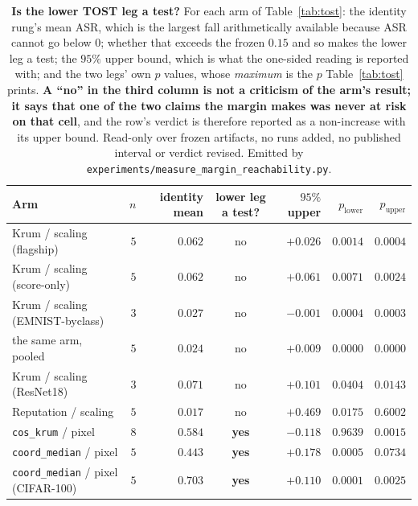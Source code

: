 \documentclass{article}
\begin{document}
\begin{table}[t]
\centering\small\setlength{\tabcolsep}{4pt}
\caption{\textbf{Is the lower TOST leg a test?} For each arm of Table~\ref{tab:tost}: the identity
rung's mean ASR, which is the largest fall arithmetically available because ASR cannot go below $0$;
whether that exceeds the frozen $0.15$ and so makes the lower leg a test; the $95\%$ upper bound, which
is what the one-sided reading is reported with; and the two legs' own $p$ values, whose \emph{maximum} is
the $p$ Table~\ref{tab:tost} prints. \textbf{A ``no'' in the third column is not a criticism of the
arm's result; it says that one of the two claims the margin makes was never at risk on that cell}, and
the row's verdict is therefore reported as a non-increase with its upper bound. Read-only over frozen
artifacts, no runs added, no published interval or verdict revised. Emitted by
\texttt{experiments/\allowbreak measure\_\allowbreak margin\_\allowbreak reachability.py}.}
\label{tab:reach}
\begin{tabular}{@{}lrrcrrr@{}}
\toprule
Arm & $n$ & identity mean & lower leg a test? & $95\%$ upper & $p_{\mathrm{lower}}$ & $p_{\mathrm{upper}}$ \\
\midrule
Krum / scaling (flagship) & $5$ & $0.062$ & no & $+0.026$ & $0.0014$ & $0.0004$ \\
Krum / scaling (score-only) & $5$ & $0.062$ & no & $+0.061$ & $0.0071$ & $0.0024$ \\
Krum / scaling (EMNIST-byclass) & $3$ & $0.027$ & no & $-0.001$ & $0.0004$ & $0.0003$ \\
\quad the same arm, pooled & $5$ & $0.024$ & no & $+0.009$ & $0.0000$ & $0.0000$ \\
Krum / scaling (ResNet18) & $3$ & $0.071$ & no & $+0.101$ & $0.0404$ & $0.0143$ \\
Reputation / scaling & $5$ & $0.017$ & no & $+0.469$ & $0.0175$ & $0.6002$ \\
\texttt{cos\_krum} / pixel & $8$ & $0.584$ & \textbf{yes} & $-0.118$ & $0.9639$ & $0.0015$ \\
\texttt{coord\_median} / pixel & $5$ & $0.443$ & \textbf{yes} & $+0.178$ & $0.0005$ & $0.0734$ \\
\texttt{coord\_median} / pixel (CIFAR-100) & $5$ & $0.703$ & \textbf{yes} & $+0.110$ & $0.0001$ & $0.0025$ \\
\bottomrule
\end{tabular}
\end{table}
\end{document}
